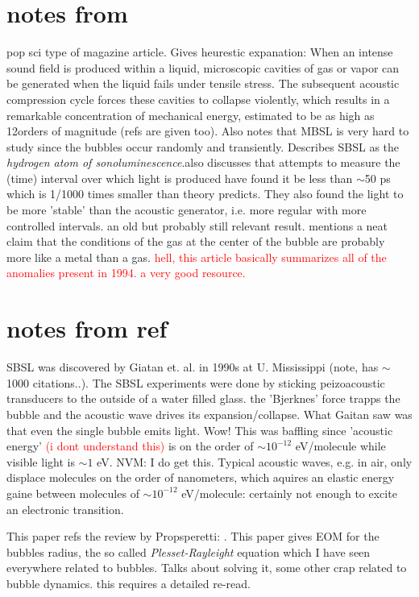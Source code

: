\documentclass[rmp,aps,nofootinbib,superscriptaddress,floatfix]{revtex4-2}
\begin{document}
\section{notes from \cite{crum1994sonoluminescence}}
pop sci type of magazine article. Gives heurestic expanation: When an intense sound field is produced within a liquid, microscopic cavities of gas or vapor can be generated when the liquid fails under tensile stress. The subsequent acoustic compression cycle forces these cavities to collapse violently, which results in a remarkable concentration of mechanical energy, estimated to be as high as 12orders of magnitude (refs are given too). Also notes that MBSL is very hard to study since the bubbles occur randomly and transiently. Describes SBSL as the \emph{hydrogen atom of sonoluminescence}.also discusses that attempts to measure the (time) interval over which light is produced have found it be less than $\sim$50 ps which is 1/1000 times smaller than theory predicts. They also found the light to be more 'stable' than the acoustic generator, i.e. more regular with more controlled intervals. an old but probably still relevant result. mentions a neat claim that the conditions of the gas at the center of the bubble are probably more like a metal than a gas. \textcolor{red}{hell, this article basically summarizes all of the anomalies present in 1994. a very good resource.}

\section{notes from ref \cite{lohse2018bubble}} 
SBSL was discovered by Giatan et. al. in 1990s at U. Mississippi \cite{gaitan1990experimental,crum1994sonoluminescence,gaitan1992sonoluminescence} (note, \cite{gaitan1992sonoluminescence} has $\sim$1000 citations..). The SBSL experiments were done by sticking peizoacoustic transducers to the outside of a water filled glass. the 'Bjerknes' force trapps the bubble and the acoustic wave drives its expansion/collapse. What Gaitan saw was that even the single bubble emits light. Wow! This was baffling since 'acoustic energy' \textcolor{red}{(i dont understand this)} is on the order of $\sim10^{-12}$ eV/molecule while visible light is $\sim1$ eV. NVM: I do get this. Typical acoustic waves, e.g. in air, only displace molecules on the order of nanometers, which aquires an elastic energy gaine between molecules of $\sim10^{-12}$ eV/molecule: certainly not enough to excite an electronic transition. 

This paper refs the review by Propsperetti: \cite{plesset1977bubble}. This paper gives EOM for the bubbles radius, the so called \emph{Plesset-Rayleight} equation which I have seen everywhere related to bubbles. Talks about solving it, some other crap related to bubble dynamics. this requires a detailed re-read.
\end{document}
